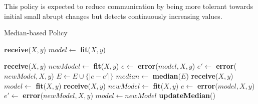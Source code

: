 \documentclass{mpaper}
\begin{document}
This policy is expected to reduce communication by being more tolerant towards initial small abrupt changes but detects continuously increasing values.

    


\begin{algorithm}[h!]
\caption{Median-based Policy}\label{polM}
\begin{algorithmic}
    \State \textbf{receive}($X, y$)
    \State $model \gets$ \textbf{fit}($X,y$)
    
        \State \textbf{receive}($X, y$)
        \State $newModel \gets$ \textbf{fit}($X,y$)
        \State $e \gets$ \textbf{error}($model,X,y$)
        \State $e' \gets$ \textbf{error}($newModel,X,y$)
        \State $E \gets E \cup \{\mid e - e' \mid\}$
    \EndFor
    \State $median \gets$ \textbf{median}($E$)
\EndProcedure
\State \textbf{receive}($X, y$)
\State $model \gets$ \textbf{fit}($X,y$)
    \State \textbf{receive}($X, y$)
    \State $newModel \gets$ \textbf{fit}($X,y$)
    \State $e \gets$ \textbf{error}($model,X,y$)
    \State $e' \gets$ \textbf{error}($newModel,X,y$)
        \State $model \gets newModel$ 
    \EndIf
        \State \textbf{updateMedian}()
    \EndIf
\EndWhile
\end{algorithmic}
\end{algorithm}
\end{document}
